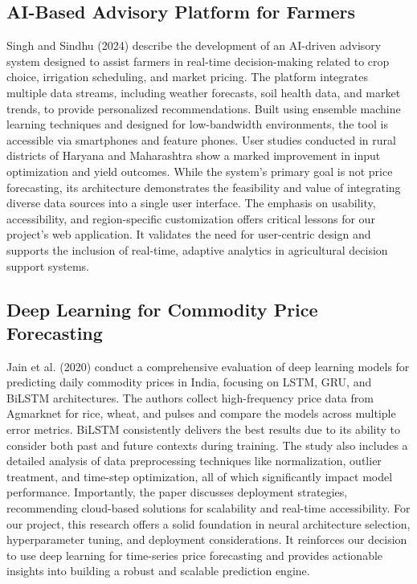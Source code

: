 \subsection{AI-Based Advisory Platform for Farmers \cite{singh2024ai}}
Singh and Sindhu (2024) describe the development of an AI-driven advisory system designed to assist farmers in real-time decision-making related to crop choice, irrigation scheduling, and market pricing. The platform integrates multiple data streams, including weather forecasts, soil health data, and market trends, to provide personalized recommendations. Built using ensemble machine learning techniques and designed for low-bandwidth environments, the tool is accessible via smartphones and feature phones. User studies conducted in rural districts of Haryana and Maharashtra show a marked improvement in input optimization and yield outcomes. While the system's primary goal is not price forecasting, its architecture demonstrates the feasibility and value of integrating diverse data sources into a single user interface. The emphasis on usability, accessibility, and region-specific customization offers critical lessons for our project's web application. It validates the need for user-centric design and supports the inclusion of real-time, adaptive analytics in agricultural decision support systems.

\subsection{Deep Learning for Commodity Price Forecasting \cite{jain2020deep}}
Jain et al. (2020) conduct a comprehensive evaluation of deep learning models for predicting daily commodity prices in India, focusing on LSTM, GRU, and BiLSTM architectures. The authors collect high-frequency price data from Agmarknet for rice, wheat, and pulses and compare the models across multiple error metrics. BiLSTM consistently delivers the best results due to its ability to consider both past and future contexts during training. The study also includes a detailed analysis of data preprocessing techniques like normalization, outlier treatment, and time-step optimization, all of which significantly impact model performance. Importantly, the paper discusses deployment strategies, recommending cloud-based solutions for scalability and real-time accessibility. For our project, this research offers a solid foundation in neural architecture selection, hyperparameter tuning, and deployment considerations. It reinforces our decision to use deep learning for time-series price forecasting and provides actionable insights into building a robust and scalable prediction engine.

